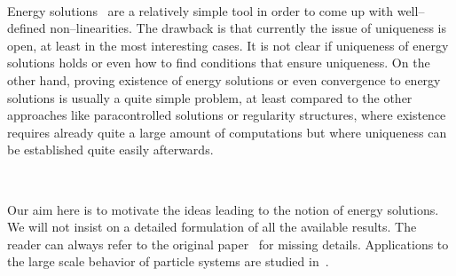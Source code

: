\documentclass[a4paper,11pt]{article}
\begin{document}
\

Energy
solutions~{\cite{goncalves_universality_2010,gubinelli_regularization_2013}}
are a relatively simple tool in order to come up with well--defined
non--linearities. The drawback is that currently the issue of uniqueness is
open, at least in the most interesting cases. It is not clear if uniqueness of
energy solutions holds or even how to find conditions that ensure uniqueness.
On the other hand, proving existence of energy solutions or even convergence
to energy solutions is usually a quite simple problem, at least compared to
the other approaches like paracontrolled solutions or regularity structures,
where existence requires already quite a large amount of computations but
where uniqueness can be established quite easily afterwards.

\

Our aim here is to motivate the ideas leading to the notion of energy
solutions. We will not insist on a detailed formulation of all the available
results. The reader can always refer to the original
paper~{\cite{gubinelli_regularization_2013}} for missing details. Applications
to the large scale behavior of particle systems are studied
in~{\cite{goncalves_universality_2010,goncalves_kpznew_2014}}.

\
\end{document}
